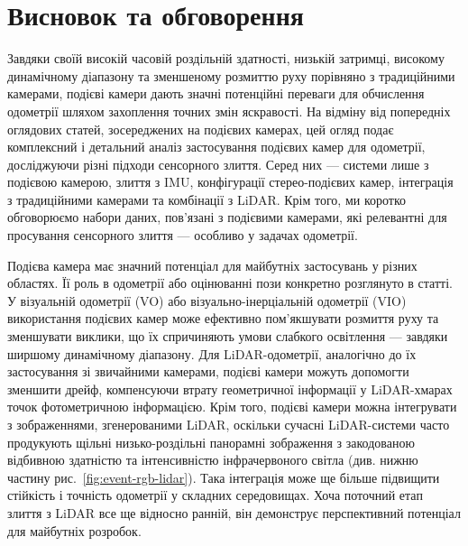 \section{Висновок та обговорення}\label{sec:conclude}
Завдяки своїй високій часовій роздільній здатності, низькій затримці, високому динамічному діапазону та зменшеному розмиттю руху порівняно з традиційними камерами, подієві камери дають значні потенційні переваги для обчислення одометрії шляхом захоплення точних змін яскравості. На відміну від попередніх оглядових статей, зосереджених на подієвих камерах, цей огляд подає комплексний і детальний аналіз застосування подієвих камер для одометрії, досліджуючи різні підходи сенсорного злиття. Серед них — системи лише з подієвою камерою, злиття з IMU, конфігурації стерео-подієвих камер, інтеграція з традиційними камерами та комбінації з LiDAR. Крім того, ми коротко обговорюємо набори даних, пов'язані з подієвими камерами, які релевантні для просування сенсорного злиття — особливо у задачах одометрії.

Подієва камера має значний потенціал для майбутніх застосувань у різних областях. Її роль в одометрії або оцінюванні пози конкретно розглянуто в статті. У візуальній одометрії (VO) або візуально-інерціальній одометрії (VIO) використання подієвих камер може ефективно пом'якшувати розмиття руху та зменшувати виклики, що їх спричиняють умови слабкого освітлення — завдяки ширшому динамічному діапазону. Для LiDAR-одометрії, аналогічно до їх застосування зі звичайними камерами, подієві камери можуть допомогти зменшити дрейф, компенсуючи втрату геометричної інформації у LiDAR-хмарах точок фотометричною інформацією.
Крім того, подієві камери можна інтегрувати з зображеннями, згенерованими LiDAR, оскільки сучасні LiDAR-системи часто продукують щільні низько-роздільні панорамні зображення з закодованою відбивною здатністю та інтенсивністю інфрачервоного світла (див. нижню частину рис.~\ref{fig:event-rgb-lidar}). Така інтеграція може ще більше підвищити стійкість і точність одометрії у складних середовищах. Хоча поточний етап злиття з LiDAR все ще відносно ранній, він демонструє перспективний потенціал для майбутніх розробок.
